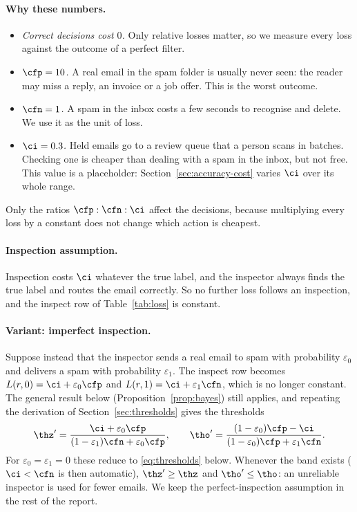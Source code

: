 \paragraph{Why these numbers.}
\begin{itemize}[itemsep=1pt,topsep=2pt]
  \item \emph{Correct decisions cost $0$.} Only relative losses matter, so we measure every loss against
        the outcome of a perfect filter.
  \item \emph{$\cfp=10$.} A real email in the spam folder is usually never seen: the reader may miss a
        reply, an invoice or a job offer. This is the worst outcome.
  \item \emph{$\cfn=1$.} A spam in the inbox costs a few seconds to recognise and delete. We use it as
        the unit of loss.
  \item \emph{$\ci=0.3$.} Held emails go to a review queue that a person scans in batches. Checking one
        is cheaper than dealing with a spam in the inbox, but not free. This value is a placeholder:
        Section~\ref{sec:accuracy-cost} varies $\ci$ over its whole range.
\end{itemize}
Only the ratios $\cfp:\cfn:\ci$ affect the decisions, because multiplying every loss by a constant
does not change which action is cheapest.

\paragraph{Inspection assumption.}
Inspection costs $\ci$ whatever the true label, and the inspector always finds the true label and
routes the email correctly. So no further loss follows an inspection, and the inspect row of
Table~\ref{tab:loss} is constant.

\paragraph{Variant: imperfect inspection.}
Suppose instead that the inspector sends a real email to spam with probability $\varepsilon_0$ and
delivers a spam with probability $\varepsilon_1$. The inspect row becomes
$L(r,0)=\ci+\varepsilon_0\cfp$ and $L(r,1)=\ci+\varepsilon_1\cfn$, which is no longer constant.
The general result below (Proposition~\ref{prop:bayes}) still applies, and repeating the derivation of
Section~\ref{sec:thresholds} gives the thresholds
\[
  \thz' = \frac{\ci+\varepsilon_0\cfp}{(1-\varepsilon_1)\cfn+\varepsilon_0\cfp},
  \qquad
  \tho' = \frac{(1-\varepsilon_0)\cfp-\ci}{(1-\varepsilon_0)\cfp+\varepsilon_1\cfn}.
\]
For $\varepsilon_0=\varepsilon_1=0$ these reduce to \eqref{eq:thresholds} below. Whenever the band
exists ($\ci<\cfn$ is then automatic), $\thz'\ge\thz$ and $\tho'\le\tho$: an unreliable inspector is
used for fewer emails. We keep the perfect-inspection assumption in the rest of the report.

